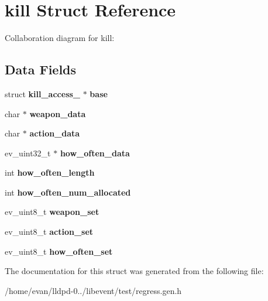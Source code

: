 \section{kill \-Struct \-Reference}
\label{structkill}


\-Collaboration diagram for kill\-:
\subsection*{\-Data \-Fields}
\begin{DoxyCompactItemize}
\item 
struct {\bf kill\-\_\-access\-\_\-} $\ast$ {\bfseries base}\label{structkill_aad7b5aa0326ae4b5ba221fe41fc5566c}

\item 
char $\ast$ {\bfseries weapon\-\_\-data}\label{structkill_a162b28fc0740bec359fd8c4275ea5859}

\item 
char $\ast$ {\bfseries action\-\_\-data}\label{structkill_a78346ad6e39aa4ef40c806eb036adf4f}

\item 
ev\-\_\-uint32\-\_\-t $\ast$ {\bfseries how\-\_\-often\-\_\-data}\label{structkill_a89c4462daddb772bd0afa883ab1f8615}

\item 
int {\bfseries how\-\_\-often\-\_\-length}\label{structkill_a9580020383bdfd6fae74dfdfbf9a0d55}

\item 
int {\bfseries how\-\_\-often\-\_\-num\-\_\-allocated}\label{structkill_a598a6f2a14b271da7f6259d101e57200}

\item 
ev\-\_\-uint8\-\_\-t {\bfseries weapon\-\_\-set}\label{structkill_ac88c7c3dab3224248a57f6492d587bdd}

\item 
ev\-\_\-uint8\-\_\-t {\bfseries action\-\_\-set}\label{structkill_abc8856436498971479681a199ce8237a}

\item 
ev\-\_\-uint8\-\_\-t {\bfseries how\-\_\-often\-\_\-set}\label{structkill_a4f224560f4bc83867c59e5d236ab8f93}

\end{DoxyCompactItemize}


\-The documentation for this struct was generated from the following file\-:\begin{DoxyCompactItemize}
\item 
/home/evan/lldpd-\/0../libevent/test/regress.\-gen.\-h\end{DoxyCompactItemize}
